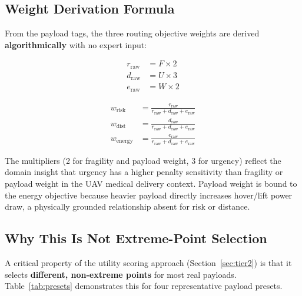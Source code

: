 \subsection{Weight Derivation Formula}

From the payload tags, the three routing objective weights are derived
\textbf{algorithmically} with no expert input:

\begin{align}
r_{\text{raw}} &= F \times 2 \label{eq:rraw} \\
d_{\text{raw}} &= U \times 3 \label{eq:draw} \\
e_{\text{raw}} &= W \times 2 \label{eq:eraw}
\end{align}

\begin{align}
w_{\mathrm{risk}}   &= \frac{r_{\text{raw}}}{r_{\text{raw}} + d_{\text{raw}} + e_{\text{raw}}} \label{eq:wrisk} \\
w_{\mathrm{dist}}   &= \frac{d_{\text{raw}}}{r_{\text{raw}} + d_{\text{raw}} + e_{\text{raw}}} \label{eq:wdist} \\
w_{\mathrm{energy}} &= \frac{e_{\text{raw}}}{r_{\text{raw}} + d_{\text{raw}} + e_{\text{raw}}} \label{eq:wenergy}
\end{align}

The multipliers (2 for fragility and payload weight, 3 for urgency) reflect the domain
insight that urgency has a higher penalty sensitivity than fragility or payload weight
in the UAV medical delivery context. Payload weight is bound to the energy objective
because heavier payload directly increases hover/lift power draw, a physically grounded
relationship absent for risk or distance.

\subsection{Why This Is Not Extreme-Point Selection}

A critical property of the utility scoring approach (Section~\ref{sec:tier2}) is that it
selects \textbf{different, non-extreme points} for most real payloads. Table~\ref{tab:presets}
demonstrates this for four representative payload presets.

